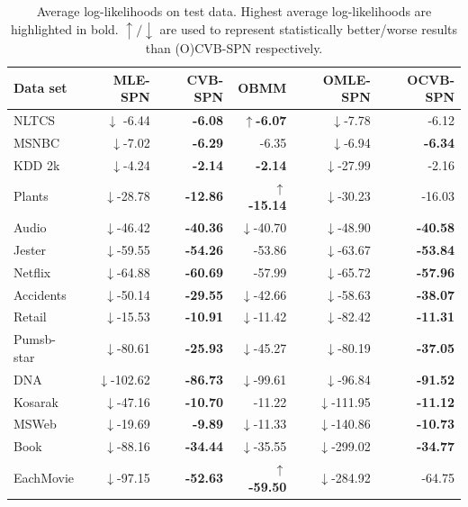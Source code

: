 \documentclass{article} %
\theoremstyle{definition}
\begin{document}
\begin{table}[htb]
\centering
\caption{Average log-likelihoods on test data. Highest average log-likelihoods are highlighted in bold. $\uparrow/\downarrow$ are used to represent statistically better/worse results than (O)CVB-SPN respectively.}
\label{table:results}
\begin{tabular}{|l|r|r||r|r|r|}\hline
\textbf{Data set} & MLE-SPN & CVB-SPN & OBMM & OMLE-SPN & OCVB-SPN \\\hline
NLTCS & $\downarrow$ -6.44 & \textbf{-6.08} & $\uparrow$\textbf{-6.07} & $\downarrow$-7.78 & -6.12\\
MSNBC & $\downarrow$-7.02 & \textbf{-6.29} & -6.35 & $\downarrow$-6.94 & \textbf{-6.34}\\
KDD 2k & $\downarrow$-4.24 & \textbf{-2.14} & \textbf{-2.14} & $\downarrow$-27.99 &  -2.16\\
Plants & $\downarrow$-28.78 & \textbf{-12.86} & $\uparrow$\textbf{-15.14} & $\downarrow$-30.23 & -16.03 \\
Audio & $\downarrow$-46.42& \textbf{-40.36} & $\downarrow$-40.70 & $\downarrow$-48.90 & \textbf{-40.58} \\
Jester & $\downarrow$-59.55  & \textbf{-54.26} & -53.86 & $\downarrow$-63.67 & \textbf{-53.84} \\
Netflix & $\downarrow$-64.88 & \textbf{-60.69} & -57.99 & $\downarrow$-65.72 & \textbf{-57.96} \\
Accidents & $\downarrow$-50.14 & \textbf{-29.55} & $\downarrow$-42.66 & $\downarrow$-58.63 & \textbf{-38.07} \\
Retail & $\downarrow$-15.53 & \textbf{-10.91} & $\downarrow$-11.42 & $\downarrow$-82.42 & \textbf{-11.31}\\
Pumsb-star & $\downarrow$-80.61 & \textbf{-25.93} & $\downarrow$-45.27 & $\downarrow$-80.19 & \textbf{-37.05} \\
DNA & $\downarrow$-102.62 & \textbf{-86.73} & $\downarrow$-99.61 & $\downarrow$-96.84 & \textbf{-91.52}\\
Kosarak & $\downarrow$-47.16  & \textbf{-10.70} & -11.22 & $\downarrow$-111.95 & \textbf{-11.12}\\
MSWeb & $\downarrow$-19.69 & \textbf{-9.89} & $\downarrow$-11.33 & $\downarrow$-140.86 & \textbf{-10.73}\\
Book & $\downarrow$-88.16 & \textbf{-34.44} & $\downarrow$-35.55 & $\downarrow$-299.02 & \textbf{-34.77} \\
EachMovie & $\downarrow$-97.15 & \textbf{-52.63}  & $\uparrow$\textbf{-59.50} & $\downarrow$-284.92 &-64.75 \\

\end{tabular}
\end{table}
\end{document}
